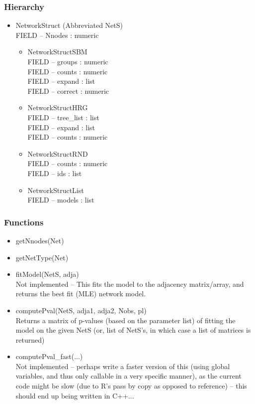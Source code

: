 \documentclass[11pt]{article}
\begin{document}
\subsubsection{Hierarchy}
\begin{itemize}

\item NetworkStruct (Abbreviated NetS)\\
FIELD -- Nnodes : numeric
\begin{itemize}
\item NetworkStructSBM\\
FIELD -- groups : numeric\\
FIELD -- counts : numeric\\
FIELD -- expand : list\\
FIELD -- correct : numeric\\
\item NetworkStructHRG\\
FIELD -- tree\_list : list\\
FIELD -- expand : list\\
FIELD -- counts : numeric\\
\item NetworkStructRND\\
FIELD -- counts : numeric\\
FIELD -- ids : list\\
\item NetworkStructList\\
FIELD -- models : list\\
\end{itemize}
\end{itemize}


\subsubsection{Functions}
\begin{itemize}
\item getNnodes(Net)
\item getNetType(Net)
\item fitModel(NetS, adja)\\
Not implemented -- This fits the model to the adjacency matrix/array, and returns the best fit (MLE) network model. 
\item computePval(NetS, adja1, adja2, Nobs, pl)\\
Returns a matrix of p-values (based on the parameter list) of fitting the model on the given NetS (or, list of NetS's, in which case a list of matrices is returned)
\item computePval\_fast(...)\\
Not implemented -- perhaps write a faster version of this (using global variables, and thus only callable in a very specific manner), as the current code might be slow (due to R's pass by copy as opposed to reference) -- this should end up being written in C++... 
\end{itemize}
\end{document}
